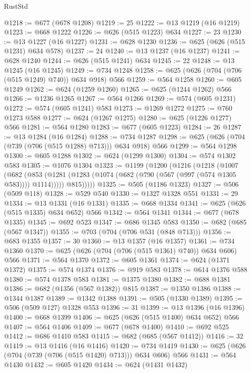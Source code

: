 \begin{lexlean}{RustStd}
\begin{coremodule}
{\begin{coremodule}
{{{{{{{{{{{{{{{@1218 := @677 (@678 @1208)
@1219 := 25
@1222 := @13 @1219 (@16 @1219)
@1223 := @668 @1222
@1226 := @626 (@515 @1223) @634
@1227 := 23
@1230 := @13 @1227 (@16 @1227)
@1231 := @628 @1230
@1236 := @625 (@626 (@515 @1231) @634 @578)
@1237 := 24
@1240 := @13 @1237 (@16 @1237)
@1241 := @628 @1240
@1244 := @626 (@515 @1241) @634
@1245 := 22
@1248 := @13 @1245 (@16 @1245)
@1249 := @734 @1248
@1258 := @625 (@626 (@704 (@706 (@515 @1249) @740)) @634 @918) @566
@1259 := @564 @1258
@1260 := @605 @1249
@1262 := @624 (@1259 @1260)
@1265 := @625 (@1244 @1262) @566
@1266 := @1236 @1265
@1267 := @564 @1266
@1269 := @574 (@605 @1231)
@1272 := @574 (@605 @1241) @583
@1273 := @1269 @1272
@1275 := @760 @1273 @588
@1277 := @624 (@1267 @1275)
@1280 := @625 (@1226 @1277) @566
@1281 := @564 @1280
@1283 := @677 (@605 @1223)
@1284 := 26
@1287 := @13 @1284 (@16 @1284)
@1288 := @734 @1287
@1298 := @625 (@626 (@704 (@739 (@706 (@515 @1288) @713))) @634 @918) @566
@1299 := @564 @1298
@1300 := @605 @1288
@1302 := @624 (@1299 @1300)
@1304 := @574 @1302 @583
@1305 := @1076 @1304
@1323 := @1199
    (@1200
      (@1216
        (@1218
          (@1007
            (@682
              (@853 (@1281 (@1283 (@1074 (@682 (@790 (@567 (@997 (@574 @1305 @583)))) @1114)))))
              @815)))))
@1325 := @505 (@1186 @1323)
@1327 := @506 (@509 @118)
@1328 := @529 @540
@1330 := @1327 @1328 @551
@1331 := 29
@1334 := @13 @1331 (@16 @1331)
@1335 := @668 @1334
@1341 := @625 (@626 (@515 @1335) @634 @652) @566
@1342 := @564 @1341
@1344 := @677 (@678 @1335)
@1345 := @692 @523
@1347 := @686 @1345 @583
@1350 := @682 (@685 (@567 @1347))
@1355 := @703 (@704 (@706 @531 (@848 @713)))
@1356 := @683 @1355
@1357 := 30
@1360 := @13 @1357 (@16 @1357)
@1361 := @734 @1360
@1370 := @625 (@626 (@704 (@706 (@515 @1361) @740)) @634 @606) @566
@1371 := @564 @1370
@1372 := @605 @1361
@1374 := @624 (@1371 @1372)
@1375 := @574 @1374
@1376 := @919 @583
@1378 := @614 @1376 @588
@1380 := @574 @1378 @583
@1381 := @1375 @1380
@1382 := @688 @1381
@1386 := @682 (@1356 (@567 @1382)) @815
@1387 := @1350 @1386
@1388 := @1344 @1387
@1389 := @1342 @1388
@1391 := @505 (@1330 @1389)
@1395 := @506 (@509 @127) @1328 @553
@1396 := 31
@1399 := @13 @1396 (@16 @1396)
@1400 := @668 @1399
@1406 := @625 (@626 (@515 @1400) @634 @652) @566
@1407 := @564 @1406
@1409 := @677 (@678 @1400)
@1410 := @692 @525
@1412 := @686 @1410 @583
@1415 := @682 (@685 (@567 @1412))
@1416 := 32
@1419 := @13 @1416 (@16 @1416)
@1420 := @734 @1419
@1430 := @625 (@626 (@704 (@739 (@706 (@515 @1420) @713))) @634 @606) @566
@1431 := @564 @1430
@1432 := @605 @1420
@1434 := @624 (@1431 @1432)
}}}}}}}}}}}}}}}
\end{coremodule}}
\end{coremodule}
\end{lexlean}
